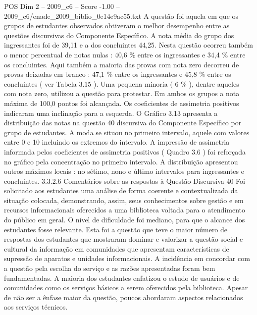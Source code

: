 \begin{textsample}{POS Dim 2 – 2009\_c6 – Score -1.00 – 2009\_c6/enade\_2009\_biblio\_0e14e9ac55.txt}
A questão foi aquela em que os grupos de estudantes observados obtiveram o melhor desempenho entre as questões discursivas do Componente Específico.
A nota média do grupo dos ingressantes foi de 39,11 e a dos concluintes 44,25.
Nesta questão ocorreu também o menor percentual de notas nulas : 40,6 \% entre os ingressantes e 34,4 \% entre os concluintes.
Aqui também a maioria das provas com nota zero decorreu de provas deixadas em branco : 47,1 \% entre os ingressantes e 45,8 \% entre os concluintes ( ver Tabela 3.15 ).
Uma pequena minoria ( 6 \% ), dentre aqueles com nota zero, utilizou a questão para protestar.
Em ambos os grupos a nota máxima de 100,0 pontos foi alcançada.
Os coeficientes de assimetria positivos indicaram uma inclinação para a esquerda.
O Gráfico 3.13 apresenta a distribuição das notas na questão 40 discursiva do Componente Específico por grupo de estudantes.
A moda se situou no primeiro intervalo, aquele com valores entre 0 e 10 incluindo os extremos do intervalo.
A impressão de assimetria informada pelos coeficientes de assimetria positivos ( Quadro 3.6 ) foi reforçada no gráfico pela concentração no primeiro intervalo.
A distribuição apresentou outros máximos locais : no sétimo, nono e último intervalos para ingressantes e concluintes. 3.3.2.6 Comentários sobre as respostas à Questão Discursiva 40 Foi solicitado aos estudantes uma análise de forma coerente e contextualizada da situação colocada, demonstrando, assim, seus conhecimentos sobre gestão e em recursos informacionais oferecidos a uma biblioteca voltada para o atendimento do público em geral.
O nível de dificuldade foi mediano, para que o alcance dos estudantes fosse relevante.
Esta foi a questão que teve o maior número de respostas dos estudantes que mostraram dominar e valorizar a questão social e cultural da informação em comunidades que apresentam características de supressão de aparatos e unidades informacionais.
A incidência em concordar com a questão pela escolha do serviço e as razões apresentadas foram bem fundamentadas.
A maioria dos estudantes enfatizou o estudo de usuários e de comunidades como os serviços básicos a serem oferecidos pela biblioteca.
Apesar de não ser a ênfase maior da questão, poucos abordaram aspectos relacionados aos serviços técnicos.

\end{textsample}
